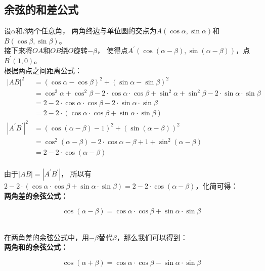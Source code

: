 \documentclass[UTF8]{ctexart}
\begin{document}
\subsection{余弦的和差公式}
    设$\alpha$和$\beta$两个任意角，
    两角终边与单位圆的交点为$A(\cos \alpha,\sin \alpha)$和$B(\cos \beta,\sin \beta)$。\\[3mm]
    接下来将$OA$和$OB$绕$O$旋转$-\beta$，
    使得点$A^{'}(\cos{(\alpha-\beta)},\sin{(\alpha-\beta)})$，点$B^{'}(1,0)$。\\[3mm]
    根据两点之间距离公式：
    \setcounter{equation}{0}
    \begin{align}
        |AB|^2
        &=(\cos \alpha-\cos \beta)^2+(\sin \alpha- \sin \beta)^2\\
        &=\cos^2{\alpha}+\cos^2{\beta}-2 \cdot \cos{\alpha} \cdot \cos{\beta}+\sin^2{\alpha}+\sin^2{\beta}-2 \cdot \sin{\alpha} \cdot \sin{\beta}\\
        &=2-2 \cdot \cos{\alpha} \cdot \cos{\beta}-2 \cdot \sin{\alpha} \cdot \sin{\beta}\\
        &=2-2 \cdot \left(\cos{\alpha}\cdot\cos{\beta}+\sin{\alpha}\cdot\sin{\beta}\right)\\[6mm]
        |A^{'}B^{'}|^2
        &=\left(\cos{(\alpha-\beta)}-1\right)^2+\left(\sin{(\alpha-\beta)}\right)^2\\
        &=\cos^2{(\alpha-\beta)}-2\cdot\cos{\alpha-\beta}+1+\sin^2{(\alpha-\beta)}\\
        &=2-2\cdot\cos{(\alpha-\beta)}
    \end{align}\\
    由于$|AB|=|A^{'}B^{'}|$，
    所以有$2-2 \cdot \left(\cos{\alpha}\cdot\cos{\beta}+\sin{\alpha}\cdot\sin{\beta}\right)=2-2\cdot\cos{(\alpha-\beta)}$，化简可得：\\[3mm]
    \textbf{两角差的余弦公式：}
    \begin{large}
    \begin{equation*}
        \cos{(\alpha-\beta)}=\cos{\alpha}\cdot\cos{\beta}+\sin{\alpha}\cdot\sin{\beta}
    \end{equation*}
    \end{large}\\[4mm]
    在两角差的余弦公式中，用$-\beta$替代$\beta$，那么我们可以得到：\\[3mm]
    \textbf{两角和的余弦公式：}
    \begin{large}
    \begin{equation*}
        \cos{(\alpha+\beta)}=\cos{\alpha}\cdot\cos{\beta}-\sin{\alpha}\cdot\sin{\beta}
    \end{equation*}
    \end{large}
\end{document}
